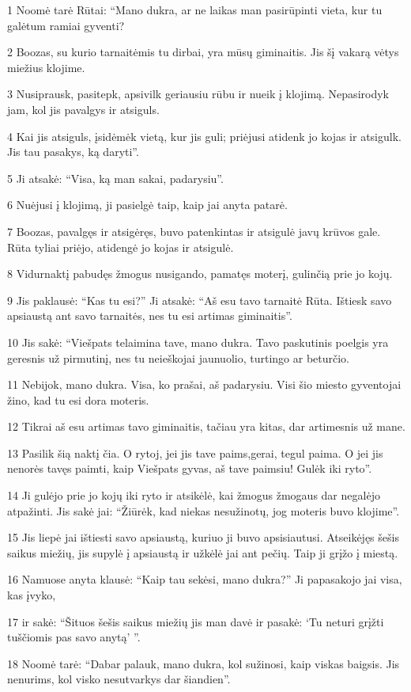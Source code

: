 \par 1 Noomė tarė Rūtai: “Mano dukra, ar ne laikas man pasirūpinti vieta, kur tu galėtum ramiai gyventi? 
\par 2 Boozas, su kurio tarnaitėmis tu dirbai, yra mūsų giminaitis. Jis šį vakarą vėtys miežius klojime. 
\par 3 Nusiprausk, pasitepk, apsivilk geriausiu rūbu ir nueik į klojimą. Nepasirodyk jam, kol jis pavalgys ir atsiguls. 
\par 4 Kai jis atsiguls, įsidėmėk vietą, kur jis guli; priėjusi atidenk jo kojas ir atsigulk. Jis tau pasakys, ką daryti”. 
\par 5 Ji atsakė: “Visa, ką man sakai, padarysiu”. 
\par 6 Nuėjusi į klojimą, ji pasielgė taip, kaip jai anyta patarė. 
\par 7 Boozas, pavalgęs ir atsigėręs, buvo patenkintas ir atsigulė javų krūvos gale. Rūta tyliai priėjo, atidengė jo kojas ir atsigulė. 
\par 8 Vidurnaktį pabudęs žmogus nusigando, pamatęs moterį, gulinčią prie jo kojų. 
\par 9 Jis paklausė: “Kas tu esi?” Ji atsakė: “Aš esu tavo tarnaitė Rūta. Ištiesk savo apsiaustą ant savo tarnaitės, nes tu esi artimas giminaitis”. 
\par 10 Jis sakė: “Viešpats telaimina tave, mano dukra. Tavo paskutinis poelgis yra geresnis už pirmutinį, nes tu neieškojai jaunuolio, turtingo ar beturčio. 
\par 11 Nebijok, mano dukra. Visa, ko prašai, aš padarysiu. Visi šio miesto gyventojai žino, kad tu esi dora moteris. 
\par 12 Tikrai aš esu artimas tavo giminaitis, tačiau yra kitas, dar artimesnis už mane. 
\par 13 Pasilik šią naktį čia. O rytoj, jei jis tave paims,­gerai, tegul paima. O jei jis nenorės tavęs paimti, kaip Viešpats gyvas, aš tave paimsiu! Gulėk iki ryto”. 
\par 14 Ji gulėjo prie jo kojų iki ryto ir atsikėlė, kai žmogus žmogaus dar negalėjo atpažinti. Jis sakė jai: “Žiūrėk, kad niekas nesužinotų, jog moteris buvo klojime”. 
\par 15 Jis liepė jai ištiesti savo apsiaustą, kuriuo ji buvo apsisiautusi. Atseikėjęs šešis saikus miežių, jis supylė į apsiaustą ir užkėlė jai ant pečių. Taip ji grįžo į miestą. 
\par 16 Namuose anyta klausė: “Kaip tau sekėsi, mano dukra?” Ji papasakojo jai visa, kas įvyko, 
\par 17 ir sakė: “Šituos šešis saikus miežių jis man davė ir pasakė: ‘Tu neturi grįžti tuščiomis pas savo anytą’ ”. 
\par 18 Noomė tarė: “Dabar palauk, mano dukra, kol sužinosi, kaip viskas baigsis. Jis nenurims, kol visko nesutvarkys dar šiandien”.



